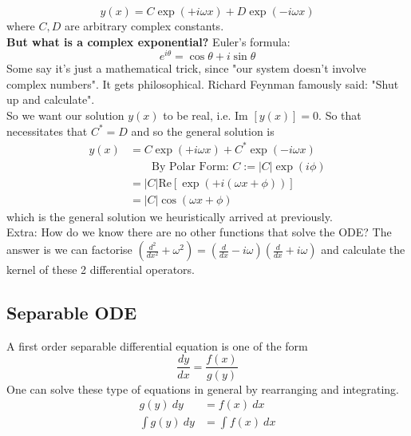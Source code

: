 \documentclass{article}
\begin{document}
$$y(x) = C \exp(+i\omega x) + D \exp(-i \omega x)$$
where $C,D$ are arbitrary complex constants.\\[10pt]
\textbf{But what is a complex exponential? } Euler's formula: 
$$e^{i\theta} = \cos \theta + i \sin \theta$$
Some say it's just a mathematical trick, since "our system doesn't involve complex numbers". It gets philosophical. Richard Feynman famously said: "Shut up and calculate". \\[10pt]
So we want our solution $y(x)$ to be real, i.e. $\text{Im }[y(x)] = 0$. So that necessitates that $C^* = D$ and so the general solution is 
\begin{align}
    y(x) &= C \exp(+i\omega x) + C^* \exp(-i\omega x)\\
    &\quad \quad \text{By Polar Form: }C := |C| \exp(i \phi) \\
    &= |C| \text{Re}[\exp(+i (\omega x + \phi))] \\
    &= |C| \cos (\omega x + \phi)
\end{align}
which is the general solution we heuristically arrived at previously. \\[10pt]
Extra: How do we know there are no other functions that solve the ODE? The answer is we can factorise $\left(\frac{d^2}{dx^2} + \omega^2\right) = \left(\frac{d}{dx} - i\omega\right) \left(\frac{d}{dx} + i\omega\right)$ and calculate the kernel of these 2 differential operators.

\subsection{Separable ODE}
A first order separable differential equation is one of the form 
$$\frac{dy}{dx} = \frac{f(x)}{g(y)}$$
One can solve these type of equations in general by rearranging and integrating.
\begin{align}
    g(y)\ dy &= f(x)\ dx     \\
    \int g(y)\ dy &= \int f(x)\ dx
\end{align}
\end{document}
